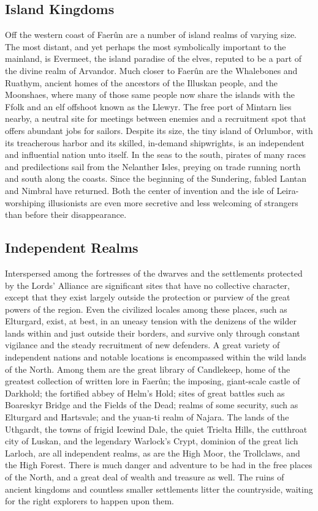 \documentclass[10pt,a4paper,twoside,twocolumn,openany,bg=print,nodeprecatedcode]{dndbook}
\begin{document}
\subsection{Island Kingdoms}
Off the western coast of Faerûn are a number of island realms of varying size. The most distant, and yet perhaps the most symbolically important to the mainland, is Evermeet, the island paradise of the elves, reputed to be a part of the divine realm of Arvandor. Much closer to Faerûn are the Whalebones and Ruathym, ancient homes of the ancestors of the Illuskan people, and the Moonshaes, where many of those same people now share the islands with the Ffolk and an elf offshoot known as the Llewyr. The free port of Mintarn lies nearby, a neutral site for meetings between enemies and a recruitment spot that offers abundant jobs for sailors. Despite its size, the tiny island of Orlumbor, with its treacherous harbor and its skilled, in-demand shipwrights, is an independent and influential nation unto itself.
In the seas to the south, pirates of many races and predilections sail from the Nelanther Isles, preying on trade running north and south along the coasts. Since the beginning of the Sundering, fabled Lantan and Nimbral have returned. Both the center of invention and the isle of Leira-worshiping illusionists are even more secretive and less welcoming of strangers than before their disappearance.
\subsection{Independent Realms}
Interspersed among the fortresses of the dwarves and the settlements protected by the Lords' Alliance are significant sites that have no collective character, except that they exist largely outside the protection or purview of the great powers of the region. Even the civilized locales among these places, such as Elturgard, exist, at best, in an uneasy tension with the denizens of the wilder lands within and just outside their borders, and survive only through constant vigilance and the steady recruitment of new defenders.
A great variety of independent nations and notable locations is encompassed within the wild lands of the North. Among them are the great library of Candlekeep, home of the greatest collection of written lore in Faerûn; the imposing, giant-scale castle of Darkhold; the fortified abbey of Helm's Hold; sites of great battles such as Boareskyr Bridge and the Fields of the Dead; realms of some security, such as Elturgard and Hartsvale; and the yuan-ti realm of Najara. The lands of the Uthgardt, the towns of frigid Icewind Dale, the quiet Trielta Hills, the cutthroat city of Luskan, and the legendary Warlock's Crypt, dominion of the great lich Larloch, are all independent realms, as are the High Moor, the Trollclaws, and the High Forest.
There is much danger and adventure to be had in the free places of the North, and a great deal of wealth and treasure as well. The ruins of ancient kingdoms and countless smaller settlements litter the countryside, waiting for the right explorers to happen upon them.
\end{document}
